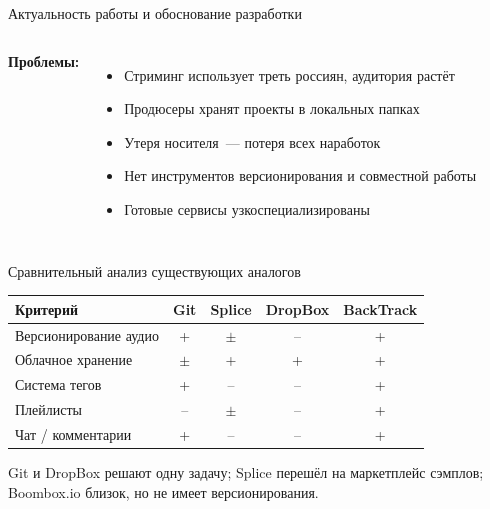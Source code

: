 \documentclass[aspectratio=169,10pt]{beamer}
\begin{document}
\begin{frame}{Актуальность работы и обоснование разработки}
  \begin{columns}[t]
      \textbf{Проблемы:}
      \begin{itemize}
        \item Стриминг использует треть россиян, аудитория растёт
        \item Продюсеры хранят проекты в локальных папках
        \item Утеря носителя~--- потеря всех наработок
        \item Нет инструментов версионирования и совместной работы
        \item Готовые сервисы узкоспециализированы
      \end{itemize}
  \end{columns}
\end{frame}

\begin{frame}{Сравнительный анализ существующих аналогов}
  \begin{center}
  \renewcommand{\arraystretch}{1.2}
  \fontsize{8.5}{10}\selectfont
  \begin{tabularx}{\textwidth}{|X|c|c|c|c|}
    \hline
    \textbf{Критерий} & \textbf{Git} & \textbf{Splice} & \textbf{DropBox} & \textbf{BackTrack} \\
    \hline
    Версионирование аудио   & +   & $\pm$ & --  & + \\
    \hline
    Облачное хранение       & $\pm$ & +   & +   & + \\
    \hline
    Система тегов           & +   & --  & --  & + \\
    \hline
    Плейлисты               & --  & $\pm$ & --  & + \\
    \hline
    Чат / комментарии       & +   & --  & --  & + \\
    \hline
  \end{tabularx}
  \end{center}
  \vspace{0.2em}
  {\fontsize{7.5}{9}\selectfont Git и DropBox решают одну задачу; Splice перешёл на маркетплейс сэмплов; Boombox.io близок, но не имеет версионирования.}
\end{frame}
\end{document}
